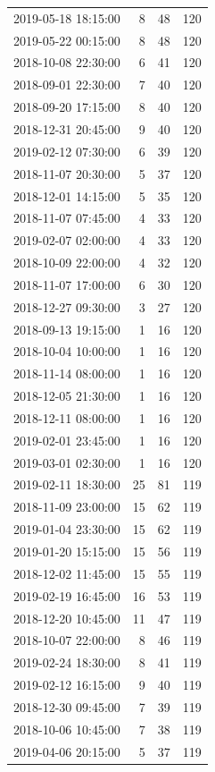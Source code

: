 \begin{tabular}{lrrr}
2019-05-18 18:15:00 & 8 & 48 & 120 \\
2019-05-22 00:15:00 & 8 & 48 & 120 \\
2018-10-08 22:30:00 & 6 & 41 & 120 \\
2018-09-01 22:30:00 & 7 & 40 & 120 \\
2018-09-20 17:15:00 & 8 & 40 & 120 \\
2018-12-31 20:45:00 & 9 & 40 & 120 \\
2019-02-12 07:30:00 & 6 & 39 & 120 \\
2018-11-07 20:30:00 & 5 & 37 & 120 \\
2018-12-01 14:15:00 & 5 & 35 & 120 \\
2018-11-07 07:45:00 & 4 & 33 & 120 \\
2019-02-07 02:00:00 & 4 & 33 & 120 \\
2018-10-09 22:00:00 & 4 & 32 & 120 \\
2018-11-07 17:00:00 & 6 & 30 & 120 \\
2018-12-27 09:30:00 & 3 & 27 & 120 \\
2018-09-13 19:15:00 & 1 & 16 & 120 \\
2018-10-04 10:00:00 & 1 & 16 & 120 \\
2018-11-14 08:00:00 & 1 & 16 & 120 \\
2018-12-05 21:30:00 & 1 & 16 & 120 \\
2018-12-11 08:00:00 & 1 & 16 & 120 \\
2019-02-01 23:45:00 & 1 & 16 & 120 \\
2019-03-01 02:30:00 & 1 & 16 & 120 \\
2019-02-11 18:30:00 & 25 & 81 & 119 \\
2018-11-09 23:00:00 & 15 & 62 & 119 \\
2019-01-04 23:30:00 & 15 & 62 & 119 \\
2019-01-20 15:15:00 & 15 & 56 & 119 \\
2018-12-02 11:45:00 & 15 & 55 & 119 \\
2019-02-19 16:45:00 & 16 & 53 & 119 \\
2018-12-20 10:45:00 & 11 & 47 & 119 \\
2018-10-07 22:00:00 & 8 & 46 & 119 \\
2019-02-24 18:30:00 & 8 & 41 & 119 \\
2019-02-12 16:15:00 & 9 & 40 & 119 \\
2018-12-30 09:45:00 & 7 & 39 & 119 \\
2018-10-06 10:45:00 & 7 & 38 & 119 \\
2019-04-06 20:15:00 & 5 & 37 & 119 \\

\end{tabular}
